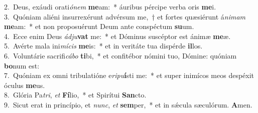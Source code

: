 {2.~}Deus, exáudi orati\textit{ó}\textit{nem} \textbf{me}am:~* áuribus pércipe verba oris \textbf{me}i.\\
{3.~}Quóniam aliéni insurrexérunt advérsum me,~† et fortes quæsiérunt á\textit{ni}\textit{mam} \textbf{me}am:~* et non proposuérunt Deum ante conspéctum \textbf{su}um.\\
{4.~}Ecce enim Deus \textit{ád}\textit{ju}\textbf{vat} me:~* et Dóminus suscéptor est ánimæ \textbf{me}æ.\\
{5.~}Avérte mala ini\textit{mí}\textit{cis} \textbf{me}is:~* et in veritáte tua dispérde \textbf{il}los.\\
{6.~}Voluntárie sacrifi\textit{cá}\textit{bo} \textbf{ti}bi,~* et confitébor nómini tuo, Dómine: quóniam \textbf{bo}num est:\\
{7.~}Quóniam ex omni tribulatióne e\textit{ri}\textit{pu}\textbf{í}sti me:~* et super inimícos meos despéxit óculus \textbf{me}us.\\
{8.~}Glória Pa\textit{tri}, \textit{et} \textbf{Fí}lio,~* et Spirítui \textbf{San}cto.\\
{9.~}Sicut erat in princípio, et \textit{nunc}, \textit{et} \textbf{sem}per,~* et in sǽcula sæculórum. \textbf{A}men.\\
